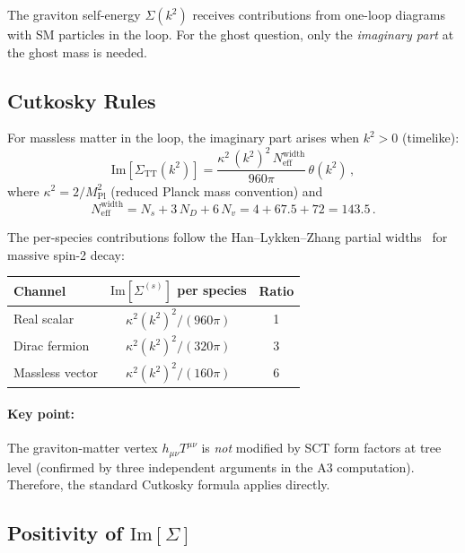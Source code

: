 \documentclass[11pt,a4paper]{article}
\newcommand{\MPl}{M_{\mathrm{Pl}}}
\newcommand{\Neff}{N_{\mathrm{eff}}}
\newcommand{\Imag}{\mathrm{Im}}
\begin{document}
The graviton self-energy $\Sigma(k^2)$ receives contributions from
one-loop diagrams with SM particles in the loop.  For the ghost question,
only the \emph{imaginary part} at the ghost mass is needed.

\subsection{Cutkosky Rules}

For massless matter in the loop, the imaginary part arises when
$k^2 > 0$ (timelike):
\begin{equation}\label{eq:Im-Sigma}
  \Imag[\Sigma_{\mathrm{TT}}(k^2)]
  = \frac{\kappa^2\,(k^2)^2\,\Neff^{\mathrm{width}}}{960\pi}\,
    \theta(k^2)\,,
\end{equation}
where $\kappa^2 = 2/\MPl^2$ (reduced Planck mass convention) and
\begin{equation}\label{eq:Neff-width}
  \Neff^{\mathrm{width}}
  = N_s + 3\,N_D + 6\,N_v
  = 4 + 67.5 + 72 = 143.5\,.
\end{equation}

The per-species contributions follow the Han--Lykken--Zhang partial
widths~\cite{HLZ1999} for massive spin-2 decay:
\begin{center}
\begin{tabular}{lcc}
\toprule
Channel & $\Imag[\Sigma^{(s)}]$ per species & Ratio \\
\midrule
Real scalar    & $\kappa^2(k^2)^2/(960\pi)$ & 1 \\
Dirac fermion  & $\kappa^2(k^2)^2/(320\pi)$ & 3 \\
Massless vector & $\kappa^2(k^2)^2/(160\pi)$ & 6 \\
\bottomrule
\end{tabular}
\end{center}

\paragraph{Key point:} The graviton-matter vertex $h_{\mu\nu}T^{\mu\nu}$
is \emph{not} modified by SCT form factors at tree level (confirmed by
three independent arguments in the A3 computation).  Therefore, the
standard Cutkosky formula applies directly.

\subsection{Positivity of $\Imag[\Sigma]$}
\end{document}
